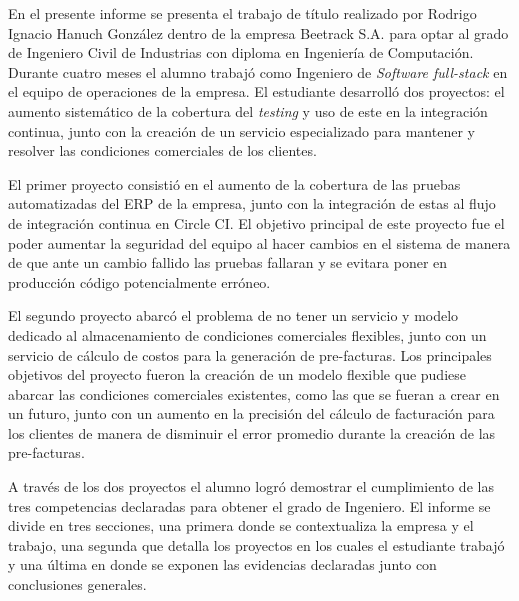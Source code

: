 En el presente informe se presenta el trabajo de título realizado por Rodrigo Ignacio Hanuch González dentro de la empresa Beetrack S.A. para optar al grado de Ingeniero Civil de Industrias con diploma en Ingeniería de Computación. Durante cuatro meses el alumno trabajó como Ingeniero de \textit{Software full-stack} en el equipo de operaciones de la empresa. El estudiante desarrolló dos proyectos: el aumento sistemático de la cobertura del \textit{testing} y uso de este en la integración continua, junto con la creación de un servicio especializado para mantener y resolver las condiciones comerciales de los clientes.

El primer proyecto consistió en el aumento de la cobertura de las pruebas automatizadas del ERP de la empresa, junto con la integración de estas al flujo de integración continua en Circle CI. El objetivo principal de este proyecto fue el poder aumentar la seguridad del equipo al hacer cambios en el sistema de manera de que ante un cambio fallido las pruebas fallaran y se evitara poner en producción código potencialmente erróneo.

El segundo proyecto abarcó el problema de no tener un servicio y modelo dedicado al almacenamiento de condiciones comerciales flexibles, junto con un servicio de cálculo de costos para la generación de pre-facturas. Los principales objetivos del proyecto fueron la creación de un modelo flexible que pudiese abarcar las condiciones comerciales existentes, como las que se fueran a crear en un futuro, junto con un aumento en la precisión del cálculo de facturación para los clientes de manera de disminuir el error promedio durante la creación de las pre-facturas.

A través de los dos proyectos el alumno logró demostrar el cumplimiento de las tres competencias declaradas para obtener el grado de Ingeniero. El informe se divide en tres secciones, una primera donde se contextualiza la empresa y el trabajo, una segunda que detalla los proyectos en los cuales el estudiante trabajó y una última en donde se exponen las evidencias declaradas junto con conclusiones generales.

